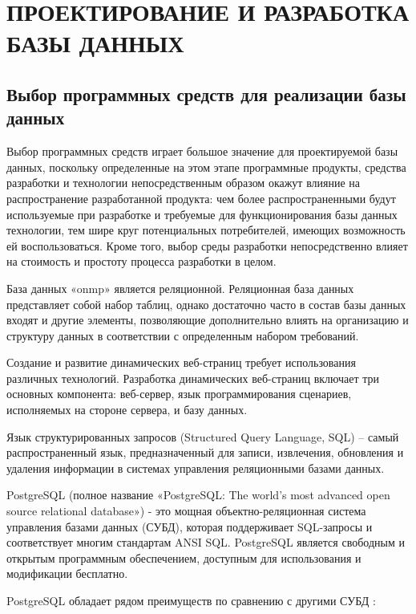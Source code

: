 \section{ПРОЕКТИРОВАНИЕ И РАЗРАБОТКА БАЗЫ ДАННЫХ}

\subsection{Выбор программных средств для реализации базы данных}

Выбор программных средств играет большое значение для проектируемой базы данных, поскольку определенные на этом этапе программные продукты, средства разработки и технологии непосредственным образом окажут влияние на распространение разработанной продукта: чем более распространенными будут используемые при разработке и требуемые для функционирования базы данных технологии, тем шире круг потенциальных потребителей, имеющих возможность ей воспользоваться. Кроме того, выбор среды разработки непосредственно влияет на стоимость и простоту процесса разработки в целом.

База данных «onmp» является реляционной. Реляционная база данных представляет собой набор таблиц, однако достаточно часто в состав базы данных входят и другие элементы, позволяющие дополнительно влиять на организацию и структуру данных в соответствии с определенным набором требований.

Создание и развитие динамических веб-страниц требует использования различных технологий. Разработка динамических веб-страниц включает три основных компонента: веб-сервер, язык программирования сценариев, исполняемых на стороне сервера, и базу данных.

Язык структурированных запросов (Structured Query Language, SQL) – самый распространенный язык, предназначенный для записи, извлечения, обновления и удаления информации в системах управления реляционными базами данных.

PostgreSQL (полное название «PostgreSQL: The world's most advanced open source relational database») - это мощная объектно-реляционная система управления базами данных (СУБД), которая поддерживает SQL-запросы и соответствует многим стандартам ANSI SQL. PostgreSQL является свободным и открытым программным обеспечением, доступным для использования и модификации бесплатно.

PostgreSQL обладает рядом преимуществ по сравнению с другими СУБД \cite{book2, book3} :

